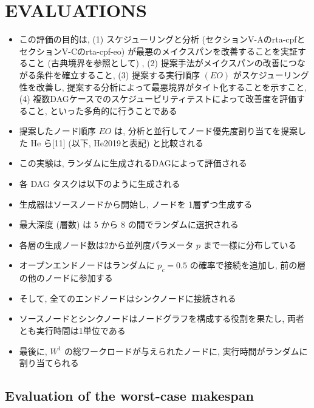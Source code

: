 
\section{EVALUATIONS}
\label{sec: EVALUATIONS}

\begin{frame}{}
    \begin{itemize}
        \item この評価の目的は,  (1) スケジューリングと分析 (セクションV-Aのrta-cpfとセクションV-Cのrta-cpf-eo) が最悪のメイクスパンを改善することを実証すること (古典境界を参照として) ,  (2) 提案手法がメイクスパンの改善につながる条件を確立すること,  (3) 提案する実行順序 $(E O)$ がスケジューリング性を改善し, 提案する分析によって最悪境界がタイト化することを示すこと,  (4) 複数DAGケースでのスケジュービリティテストによって改善度を評価すること, といった多角的に行うことである
\item 提案したノード順序 $E O$ は, 分析と並行してノード優先度割り当てを提案した $\mathrm{He}$ ら[11] (以下, He2019と表記) と比較される
    \end{itemize}
\end{frame}

\begin{frame}{}
    \begin{itemize}
        \item この実験は, ランダムに生成されるDAGによって評価される
\item 各 DAG タスクは以下のように生成される
\item 生成器はソースノードから開始し, ノードを 1層ずつ生成する
\item 最大深度 (層数) は 5 から 8 の間でランダムに選択される
\item 各層の生成ノード数は2から並列度パラメータ $p$ まで一様に分布している
\item オープンエンドノードはランダムに $p_{c}=0.5$ の確率で接続を追加し, 前の層の他のノードに参加する
\item そして, 全てのエンドノードはシンクノードに接続される
\item ソースノードとシンクノードはノードグラフを構成する役割を果たし, 両者とも実行時間は1単位である
\item 最後に, $W^{1}$ の総ワークロードが与えられたノードに, 実行時間がランダムに割り当てられる
    \end{itemize}
\end{frame}


\subsection{Evaluation of the worst-case makespan}
\label{ssec: Evaluation of the worst-case makespan}

